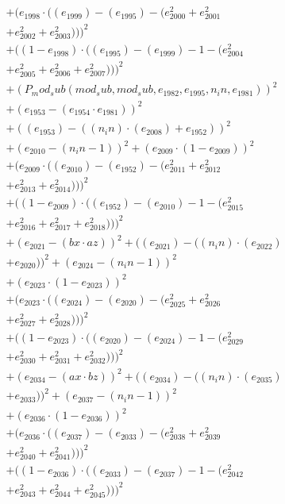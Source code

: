 \documentclass[10pt, a4paper]{article}
\begin{document}
\begin{align*}
& + (e_{1998}  \cdot  ((e_{1999}) - (e_{1995}) - (e_{2000}^{2} + e_{2001}^{2} \\
& + e_{2002}^{2} + e_{2003}^{2})))^{2} \\
& + ((1 - e_{1998})  \cdot  ((e_{1995}) - (e_{1999}) - 1 - (e_{2004}^{2} \\
& + e_{2005}^{2} + e_{2006}^{2} + e_{2007}^{2})))^{2} \\
& + (P_mod_sub(mod_sub, mod_sub, e_{1982}, e_{1995}, n_in, e_{1981}))^{2} \\
& + (e_{1953} - (e_{1954}  \cdot  e_{1981}))^{2} \\
& + ((e_{1953}) - ((n_in)  \cdot  (e_{2008}) + e_{1952}))^{2} \\
& + (e_{2010} - (n_in - 1))^{2} + (e_{2009}  \cdot  (1 - e_{2009}))^{2} \\
& + (e_{2009}  \cdot  ((e_{2010}) - (e_{1952}) - (e_{2011}^{2} + e_{2012}^{2} \\
& + e_{2013}^{2} + e_{2014}^{2})))^{2} \\
& + ((1 - e_{2009})  \cdot  ((e_{1952}) - (e_{2010}) - 1 - (e_{2015}^{2} \\
& + e_{2016}^{2} + e_{2017}^{2} + e_{2018}^{2})))^{2} \\
& + (e_{2021} - (bx  \cdot  az))^{2} + ((e_{2021}) - ((n_in)  \cdot  (e_{2022}) \\
& + e_{2020}))^{2} + (e_{2024} - (n_in - 1))^{2} \\
& + (e_{2023}  \cdot  (1 - e_{2023}))^{2} \\
& + (e_{2023}  \cdot  ((e_{2024}) - (e_{2020}) - (e_{2025}^{2} + e_{2026}^{2} \\
& + e_{2027}^{2} + e_{2028}^{2})))^{2} \\
& + ((1 - e_{2023})  \cdot  ((e_{2020}) - (e_{2024}) - 1 - (e_{2029}^{2} \\
& + e_{2030}^{2} + e_{2031}^{2} + e_{2032}^{2})))^{2} \\
& + (e_{2034} - (ax  \cdot  bz))^{2} + ((e_{2034}) - ((n_in)  \cdot  (e_{2035}) \\
& + e_{2033}))^{2} + (e_{2037} - (n_in - 1))^{2} \\
& + (e_{2036}  \cdot  (1 - e_{2036}))^{2} \\
& + (e_{2036}  \cdot  ((e_{2037}) - (e_{2033}) - (e_{2038}^{2} + e_{2039}^{2} \\
& + e_{2040}^{2} + e_{2041}^{2})))^{2} \\
& + ((1 - e_{2036})  \cdot  ((e_{2033}) - (e_{2037}) - 1 - (e_{2042}^{2} \\
& + e_{2043}^{2} + e_{2044}^{2} + e_{2045}^{2})))^{2} \\

\end{align*}
\end{document}
